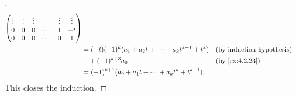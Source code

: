 \begin{proof}[]
\begin{align*}
\begin{pmatrix}
                                            \vdots & \vdots & \vdots &        & \vdots & \vdots \\
                                            0      & 0      & 0      & \cdots & 1      & -t     \\
                                            0      & 0      & 0      & \cdots & 0      & 1
                                          \end{pmatrix}                                                \\
            & = (-t) (-1)^k (a_1 + a_2 t + \cdots + a_k t^{k - 1} + t^k)                               &  & \text{(by induction hypothesis)} \\
            & \quad + (-1)^{k + 3} a_0                                                                 &  & \text{(by \cref{ex:4.2.23})}     \\
            & = (-1)^{k + 1} (a_0 + a_1 t + \cdots + a_k t^k + t^{k + 1}).
  \end{align*}
  This closes the induction.
\end{proof}

\begin{ex}\label{ex:5.4.25}

\end{ex}

\begin{ex}\label{ex:5.4.32}

\end{ex}

\begin{ex}\label{ex:5.4.34}

\end{ex}

\begin{ex}\label{ex:5.4.36}

\end{ex}
